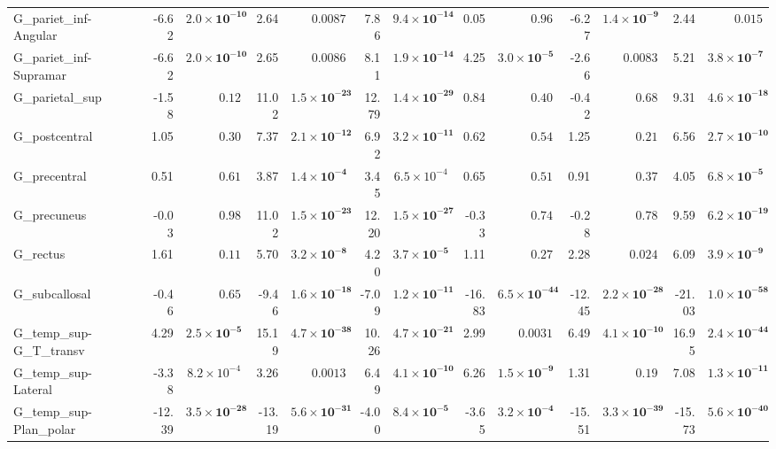 {\begin{longtable}{llrrrrrrrrrrrr}
G\_pariet\_inf-Angular &  & -6.62 & $\mathbf{2.0{\times}10^{-10}}$ & 2.64 & $0.0087$ & 7.86 & $\mathbf{9.4{\times}10^{-14}}$ & 0.05 & $0.96$ & -6.27 & $\mathbf{1.4{\times}10^{-9}}$ & 2.44 & $0.015$ \\
G\_pariet\_inf-Supramar &  & -6.62 & $\mathbf{2.0{\times}10^{-10}}$ & 2.65 & $0.0086$ & 8.11 & $\mathbf{1.9{\times}10^{-14}}$ & 4.25 & $\mathbf{3.0{\times}10^{-5}}$ & -2.66 & $0.0083$ & 5.21 & $\mathbf{3.8{\times}10^{-7}}$ \\
G\_parietal\_sup &  & -1.58 & $0.12$ & 11.02 & $\mathbf{1.5{\times}10^{-23}}$ & 12.79 & $\mathbf{1.4{\times}10^{-29}}$ & 0.84 & $0.40$ & -0.42 & $0.68$ & 9.31 & $\mathbf{4.6{\times}10^{-18}}$ \\
G\_postcentral &  & 1.05 & $0.30$ & 7.37 & $\mathbf{2.1{\times}10^{-12}}$ & 6.92 & $\mathbf{3.2{\times}10^{-11}}$ & 0.62 & $0.54$ & 1.25 & $0.21$ & 6.56 & $\mathbf{2.7{\times}10^{-10}}$ \\
G\_precentral &  & 0.51 & $0.61$ & 3.87 & $\mathbf{1.4{\times}10^{-4}}$ & 3.45 & $6.5{\times}10^{-4}$ & 0.65 & $0.51$ & 0.91 & $0.37$ & 4.05 & $\mathbf{6.8{\times}10^{-5}}$ \\
G\_precuneus &  & -0.03 & $0.98$ & 11.02 & $\mathbf{1.5{\times}10^{-23}}$ & 12.20 & $\mathbf{1.5{\times}10^{-27}}$ & -0.33 & $0.74$ & -0.28 & $0.78$ & 9.59 & $\mathbf{6.2{\times}10^{-19}}$ \\
G\_rectus &  & 1.61 & $0.11$ & 5.70 & $\mathbf{3.2{\times}10^{-8}}$ & 4.20 & $\mathbf{3.7{\times}10^{-5}}$ & 1.11 & $0.27$ & 2.28 & $0.024$ & 6.09 & $\mathbf{3.9{\times}10^{-9}}$ \\
G\_subcallosal &  & -0.46 & $0.65$ & -9.46 & $\mathbf{1.6{\times}10^{-18}}$ & -7.09 & $\mathbf{1.2{\times}10^{-11}}$ & -16.83 & $\mathbf{6.5{\times}10^{-44}}$ & -12.45 & $\mathbf{2.2{\times}10^{-28}}$ & -21.03 & $\mathbf{1.0{\times}10^{-58}}$ \\
G\_temp\_sup-G\_T\_transv &  & 4.29 & $\mathbf{2.5{\times}10^{-5}}$ & 15.19 & $\mathbf{4.7{\times}10^{-38}}$ & 10.26 & $\mathbf{4.7{\times}10^{-21}}$ & 2.99 & $0.0031$ & 6.49 & $\mathbf{4.1{\times}10^{-10}}$ & 16.95 & $\mathbf{2.4{\times}10^{-44}}$ \\
G\_temp\_sup-Lateral &  & -3.38 & $8.2{\times}10^{-4}$ & 3.26 & $0.0013$ & 6.49 & $\mathbf{4.1{\times}10^{-10}}$ & 6.26 & $\mathbf{1.5{\times}10^{-9}}$ & 1.31 & $0.19$ & 7.08 & $\mathbf{1.3{\times}10^{-11}}$ \\
G\_temp\_sup-Plan\_polar &  & -12.39 & $\mathbf{3.5{\times}10^{-28}}$ & -13.19 & $\mathbf{5.6{\times}10^{-31}}$ & -4.00 & $\mathbf{8.4{\times}10^{-5}}$ & -3.65 & $\mathbf{3.2{\times}10^{-4}}$ & -15.51 & $\mathbf{3.3{\times}10^{-39}}$ & -15.73 & $\mathbf{5.6{\times}10^{-40}}$ \\

\end{longtable}}
